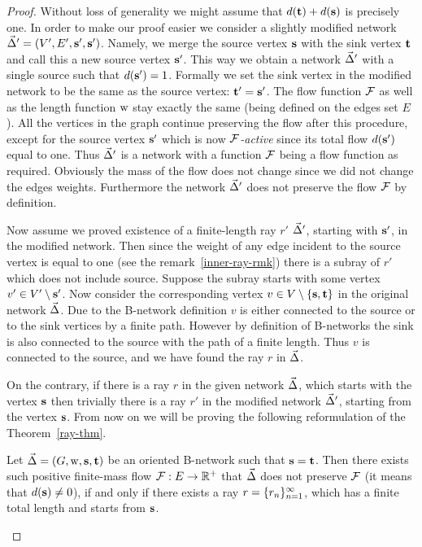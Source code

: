 \documentclass[12pt]{amsart}
\begin{document}
    \begin{proof}
      Without loss of generality we might assume that $d(\mathbf{t}) + d(\mathbf{s})$ is precisely one.
      In order to make our proof easier we consider a slightly modified network $\vec{\Delta}' = (V', E', \mathbf{s}', \mathbf{s}')$.
      Namely, we merge the source vertex $\mathbf{s}$ with the sink vertex $\mathbf{t}$ and call this a
        new source vertex $\mathbf{s}'$.
      This way we obtain a network $\vec{\Delta}'$ with a single source such that $d(\mathbf{s}') = 1$.
      Formally we set the sink vertex in the modified network to be the same as the source vertex: $\mathbf{t}'=\mathbf{s}'$.
      The flow function $\mathcal{F}$ as well as the length function $\mathrm{w}$ stay exactly the same (being defined on the edges set $E$).
      All the vertices in the graph continue preserving the flow after this procedure, except for the source vertex $\mathbf{s}'$
        which is now \emph{$\mathcal{F}$-active} since its total flow $d(\mathbf{s}')$ equal to one.
      Thus $\vec{\Delta}'$ is a network with a function $\mathcal{F}$ being a flow function as required.
      Obviously the mass of the flow does not change since we did not change the edges weights.
      Furthermore the network $\vec{\Delta}'$ does not preserve the flow $\mathcal{F}$ by definition.

      Now assume we proved existence of a finite-length ray $r'$ $\vec{\Delta}'$, starting with $\mathbf{s}'$, in the modified network.
      Then since the weight of any edge incident to the source vertex is equal to one (see the remark~\ref{inner-ray-rmk})
        there is a subray of $r'$ which does not include source.
      Suppose the subray starts with some vertex $v' \in V' \setminus \mathbf{s}'$.
      Now consider the corresponding vertex $v \in V \setminus \left\{\mathbf{s}, \mathbf{t}\right\}$ in the original network $\vec{\Delta}$.
      Due to the B-network definition $v$ is either connected to the source or to the sink vertices by a finite path.
      However by  definition of B-networks the sink is also connected to the source with the path of a finite length.
      Thus $v$ is connected to the source, and we have found the ray $r$ in $\vec{\Delta}$.

      On the contrary, if there is a ray $r$ in the given network $\vec{\Delta}$, which starts with the vertex $\mathbf{s}$
        then trivially there is a ray $r'$ in the modified network $\vec{\Delta}'$, starting from the vertex $\mathbf{s}$.
      From now on we will be proving the following reformulation of the Theorem~\ref{ray-thm}.
      \begin{theorem*}
        Let $\vec{\Delta} = (G, \mathrm{w}, \mathbf{s}, \mathbf{t})$ be an oriented B-network such that $\mathbf{s} = \mathbf{t}$.
        Then there exists such positive finite-mass flow $\mathcal{F}: E \to \mathbb{R}^{+}$ that
          $\vec{\Delta}$ does not preserve $\mathcal{F}$ (it means that $d(\mathbf{s}) \neq 0$),
          if and only if there exists a ray $r = \{{r}_n\}_{n=1}^\infty$, which has a finite total length and starts from $\mathbf{s}$.
      \end{theorem*}

\end{proof}
\end{document}
